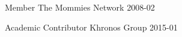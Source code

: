 


\begin{cvhonors}

  \cvhonor
    {Member} %
    {The Mommies Network} %
    {} %
    {2008-02} %


  \cvhonor
    {Academic Contributor} %
    {Khronos Group} %
    {} %
    {2015-01} %


\end{cvhonors}


